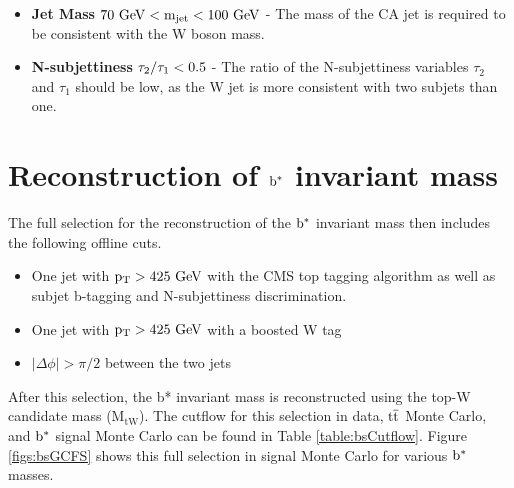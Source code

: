 \begin{itemize}
\item {\bf Jet Mass}  $\mathrm{\boldmath 70~\mathrm{GeV} < m_{\text{jet}} < 100~\mathrm{GeV}}$ - The mass of the CA jet is required to be consistent with the W boson mass. 
\item {\bf N-subjettiness} $\mathrm{\boldmath \tau_{2}/\tau_{1} < 0.5}$  - The ratio of the N-subjettiness variables $\tau_{2}$ and $\tau_{1}$ should be low, as the W jet is more consistent with two subjets than one.
\end{itemize}

\section{Reconstruction of $\mathrm{b}^{*}$ invariant mass}
\label{sec:bsfullselection}
The full selection for the reconstruction of the $\mathrm{b}^{*}$ invariant mass then includes the following offline cuts.
\begin{itemize}
\item One jet with $\mathrm{p_{T}} > 425~\mathrm{GeV}$ with the CMS top tagging algorithm as well as subjet b-tagging and N-subjettiness discrimination.
\item One jet with $\mathrm{p_{T}} > 425~\mathrm{GeV}$ with a boosted W tag
\item $|\Delta \phi| > \pi/2$ between the two jets
\end{itemize}
After this selection, the b* invariant mass is reconstructed using the top-W candidate mass ($\mathrm{M_{tW}}$).
The cutflow for this selection in data, $\mathrm{t\overline{t}}$ Monte Carlo, and $\mathrm{b}^{*}$ signal Monte Carlo can be found in Table \ref{table:bsCutflow}.
Figure \ref{figs:bsGCFS} shows this full selection in signal Monte Carlo for various $\mathrm{b}^{*}$ masses.  



